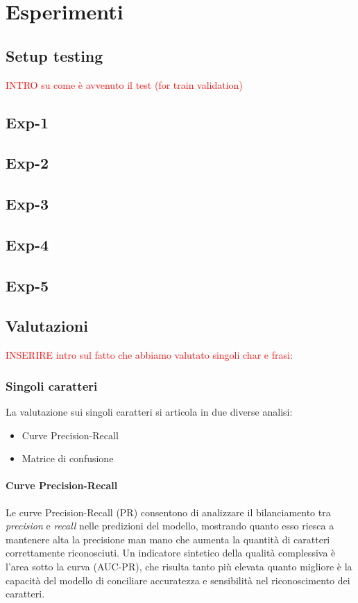 \chapter{Esperimenti}
\section*{Setup testing}
\textcolor{red}{INTRO su come è avvenuto il test (for train validation)}
\section{Exp-1}
\section{Exp-2}
\section{Exp-3}
\section{Exp-4}
\section{Exp-5}

\section{Valutazioni}
\textcolor{red}{INSERIRE intro sul fatto che abbiamo valutato singoli char e frasi}:

\subsection{Singoli caratteri}
La valutazione sui singoli caratteri si articola in due diverse analisi:
\begin{itemize}
    \item Curve Precision-Recall
    \item Matrice di confusione
\end{itemize}

\subsubsection*{Curve Precision-Recall}
Le curve Precision-Recall (PR) consentono di analizzare il bilanciamento tra \emph{precision} e \emph{recall} nelle predizioni del modello, mostrando quanto esso riesca a mantenere alta la precisione man mano che aumenta la quantità di caratteri correttamente riconosciuti. Un indicatore sintetico della qualità complessiva è l'area sotto la curva (AUC-PR), che risulta tanto più elevata quanto migliore è la capacità del modello di conciliare accuratezza e sensibilità nel riconoscimento dei caratteri.


